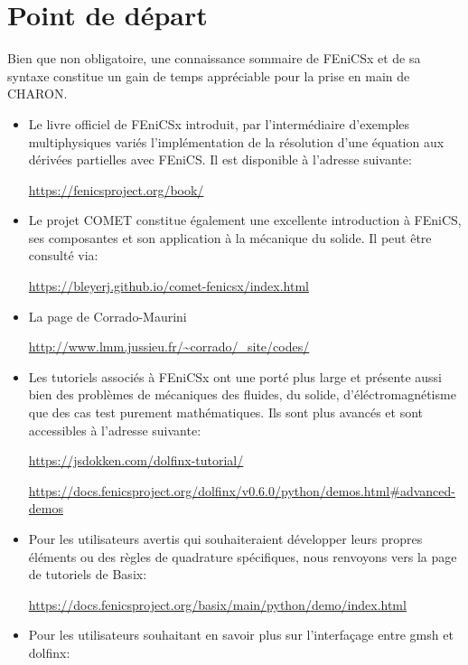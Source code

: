 \documentclass[10pt]{book}
\begin{document}
\section*{Point de départ}
Bien que non obligatoire, une connaissance sommaire de FEniCSx et de sa syntaxe constitue un gain de temps appréciable pour la prise en main de CHARON.
\begin{itemize}[label=$\star$]
\item Le livre officiel de FEniCSx introduit, par l'intermédiaire d'exemples multiphysiques variés l'implémentation de la résolution d'une équation aux dérivées partielles avec FEniCS. Il est disponible à l'adresse suivante:
\begin{center}
\url{https://fenicsproject.org/book/}
\end{center}
\item Le projet COMET constitue également une excellente introduction à FEniCS, ses composantes et son application à la mécanique du solide. Il peut être consulté via:
\begin{center}
\url{https://bleyerj.github.io/comet-fenicsx/index.html}
\end{center}
\item La page de Corrado-Maurini
\begin{center}
\url{http://www.lmm.jussieu.fr/~corrado/_site/codes/}
\end{center}
\item Les tutoriels associés à FEniCSx ont une porté plus large et présente aussi bien des problèmes de mécaniques des fluides, du solide, d'éléctromagnétisme que des cas test purement mathématiques. Ils sont plus avancés et sont accessibles à l'adresse suivante:
\begin{center}
\url{https://jsdokken.com/dolfinx-tutorial/}
\end{center}
\begin{center}
\url{https://docs.fenicsproject.org/dolfinx/v0.6.0/python/demos.html#advanced-demos}
\end{center}
\item Pour les utilisateurs avertis qui souhaiteraient développer leurs propres éléments ou des règles de quadrature spécifiques, nous renvoyons vers la page de tutoriels de Basix:
\begin{center}
\url{https://docs.fenicsproject.org/basix/main/python/demo/index.html}
\end{center}
\item Pour les utilisateurs souhaitant en savoir plus sur l’interfaçage entre gmsh et dolfinx:

\end{itemize}
\end{document}
